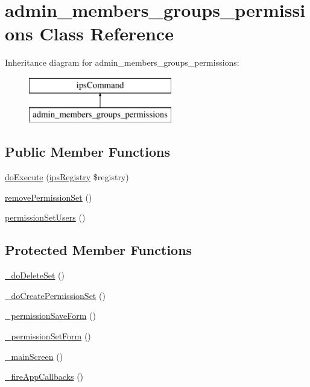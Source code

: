 \hypertarget{classadmin__members__groups__permissions}{\section{admin\-\_\-members\-\_\-groups\-\_\-permissions Class Reference}
\label{classadmin__members__groups__permissions}
}
Inheritance diagram for admin\-\_\-members\-\_\-groups\-\_\-permissions\-:\begin{figure}[H]
\begin{center}
\leavevmode
\includegraphics[height=2.000000cm]{classadmin__members__groups__permissions}
\end{center}
\end{figure}
\subsection*{Public Member Functions}
\begin{DoxyCompactItemize}
\item 
\hyperlink{classadmin__members__groups__permissions_afbc4e912a0604b94d47d66744c64d8ba}{do\-Execute} (\hyperlink{classips_registry}{ips\-Registry} \$registry)
\item 
\hyperlink{classadmin__members__groups__permissions_acd0d1b780e5b34bacdce8c60b9d6eeb9}{remove\-Permission\-Set} ()
\item 
\hyperlink{classadmin__members__groups__permissions_a87d2a7210a72683f8e1732522072fe83}{permission\-Set\-Users} ()
\end{DoxyCompactItemize}
\subsection*{Protected Member Functions}
\begin{DoxyCompactItemize}
\item 
\hyperlink{classadmin__members__groups__permissions_a0d196c92ae705e0f9f9129e65381a3ec}{\-\_\-do\-Delete\-Set} ()
\item 
\hyperlink{classadmin__members__groups__permissions_a19c277a71314ce4041c4a45acd5c598a}{\-\_\-do\-Create\-Permission\-Set} ()
\item 
\hyperlink{classadmin__members__groups__permissions_ad5aaebad4c7b12d870e6c95c2b91e7f8}{\-\_\-permission\-Save\-Form} ()
\item 
\hyperlink{classadmin__members__groups__permissions_a2218a1edbafd61f857b438313530dd93}{\-\_\-permission\-Set\-Form} ()
\item 
\hyperlink{classadmin__members__groups__permissions_af0d4b2cda2063751a0d768db8f78a38e}{\-\_\-main\-Screen} ()
\item 
\hyperlink{classadmin__members__groups__permissions_ae3d9d031ca2bd4fbf02cf4625cebf069}{\-\_\-fire\-App\-Callbacks} ()
\end{DoxyCompactItemize}
